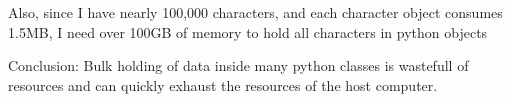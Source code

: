 Also, since I have nearly 100,000 characters, and each character object consumes 1.5MB, I need over 100GB of memory to hold all characters in python objects

Conclusion:  Bulk holding of data inside many python classes is wastefull of resources and can quickly exhaust the resources of the host computer.
